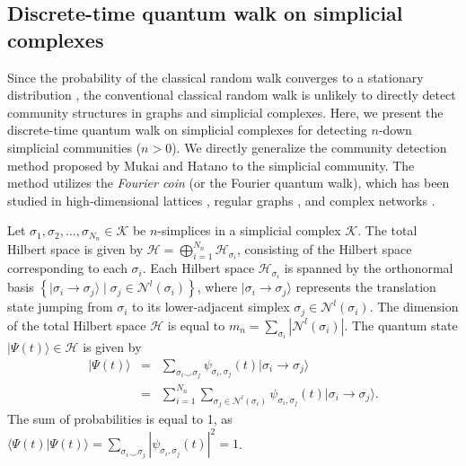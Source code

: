 \documentclass[10pt, letterpaper]{article}
\begin{document}
\subsection{Discrete-time quantum walk on simplicial complexes}
Since the probability of the classical random walk converges to a stationary distribution \cite{Mitzenmacher2005}, the conventional classical random walk is unlikely to directly detect community structures in graphs and simplicial complexes. Here, we present the discrete-time quantum walk on simplicial complexes for detecting $n$-down simplicial communities ($n>0$). We directly generalize the community detection method proposed by Mukai and Hatano \cite{Mukai2020} to the simplicial community. The method utilizes the \textit{Fourier coin} (or the Fourier quantum walk), which has been studied in high-dimensional lattices \cite{Mackay2002}, regular graphs \cite{Saito2019}, and complex networks \cite{Mukai2020}.

Let $\sigma_1, \sigma_2, \ldots, \sigma_{N_n}\in\mathcal{K}$ be $n$-simplices in a simplicial complex $\mathcal{K}$. The total Hilbert space is given by $\mathcal{H}=\bigoplus_{i=1}^{N_n} \mathcal{H}_{\sigma_i}$, consisting of the Hilbert space corresponding to each $\sigma_i$. Each Hilbert space $\mathcal{H}_{\sigma_i}$ is spanned by the orthonormal basis $\left\{\vert\sigma_i\to\sigma_j\rangle \mid \sigma_j\in\mathcal{N}^{l}(\sigma_i)\right\}$, where $\vert\sigma_i\to\sigma_j\rangle$ represents the translation state jumping from $\sigma_i$ to its lower-adjacent simplex $\sigma_j\in \mathcal{N}^{l}(\sigma_i)$. The dimension of the total Hilbert space $\mathcal{H}$ is equal to $m_n=\sum_{\sigma_i} \left|\mathcal{N}^{l}(\sigma_i)\right|$. The quantum state $\vert\Psi(t)\rangle\in\mathcal{H}$ is given by
\begin{eqnarray}
\vert\Psi(t)\rangle &=& \sum_{\sigma_i\smile\sigma_j} \psi_{\sigma_i,\sigma_j}(t) \vert\sigma_i\to\sigma_j\rangle \nonumber \\
&=& \sum_{i=1}^{N_n} \sum_{\sigma_j\in\mathcal{N}^{l}(\sigma_i)} \psi_{\sigma_i,\sigma_j}(t) \vert\sigma_i\to\sigma_j\rangle.
\end{eqnarray}
The sum of probabilities is equal to 1, as $\langle\Psi(t)\vert\Psi(t)\rangle=\sum_{\sigma_i\smile\sigma_j} \left|\psi_{\sigma_i,\sigma_j}(t)\right|^2=1$.
\end{document}
